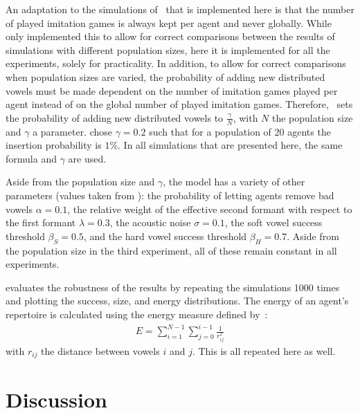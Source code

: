\documentclass{article}
\begin{document}
An adaptation to the simulations of~ that is
implemented here is that the number of played imitation games is always kept per agent and never globally.
While~ only implemented this to allow for correct comparisons
between the results of simulations with different population sizes, here it is implemented for all the experiments, solely for practicality.
In addition, to allow for correct comparisons when population sizes are varied, the probability of adding new distributed vowels must be made dependent on the
number of imitation games played per agent instead of on the global number of played imitation games. Therefore,~
sets the probability of adding new distributed vowels to $\frac{\gamma}{N}$, with $N$ the population size and $\gamma$ a parameter.
 chose $\gamma=0.2$ such that for a population of 20 agents the insertion probability is $1\%$.
In all simulations that are presented here, the same formula and $\gamma$ are used.

Aside from the population size and $\gamma$, the model has a variety of other parameters (values taken from ): the probability of letting agents
remove bad vowels $\alpha=0.1$, the relative weight of the effective second formant with respect to the first formant $\lambda=0.3$, the acoustic noise $\sigma=0.1$, the soft vowel success
threshold $\beta_S=0.5$, and the hard vowel success threshold $\beta_H=0.7$.
Aside from the population size in the third experiment, all of these remain constant in all experiments.

 evaluates the robustness of
the results by repeating the simulations 1000 times and plotting the success, size, and energy distributions.
The energy of an agent's repertoire is calculated using the energy measure defined by~:
\begin{align}
    \label{form:energy}
    E = \sum^{N-1}_{i=1}\sum^{i-1}_{j=0} \frac{1}{r_{ij}^2}
\end{align}
with $r_{ij}$ the distance between vowels $i$ and $j$.
This is all repeated here as well.

\section{Discussion\label{sec:discus}}
\end{document}
